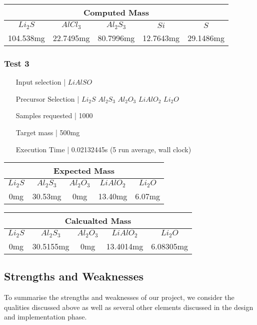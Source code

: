 \begin{table}[h!]
\centering
\begin{tabular}{@{}ccccc@{}}
\toprule
\multicolumn{5}{c}{Computed Mass} \\ \midrule
$Li_2S$ & $AlCl_3$ & $Al_2S_3$ & $Si$ & $S$ \\
104.538mg & 22.7495mg & 80.7996mg & 12.7643mg & 29.1486mg \\ \bottomrule
\end{tabular}
\end{table}

\subsubsection{Test 3}
\begin{enumerate}[label = {}, leftmargin=\widthof{Precursor Selection |}+\labelsep]
    \item[Input selection |] $LiAlSO$
    \item[Precursor Selection |] $Li_2S$ $Al_2S_3$ $Al_2O_3$ $LiAlO_2$ $Li_2O$
    \item[Samples requested |] 1000
    \item[Target mass |] 500mg
    \item[Execution Time |] 0.02132445s (5 run average, wall clock)
\end{enumerate}

\begin{table}[h!]
\centering
\begin{tabular}{@{}ccccc@{}}
\toprule
\multicolumn{5}{c}{Expected Mass} \\ \midrule
$Li_2S$ & $Al_2S_3$ & $Al_2O_3$ & $LiAlO_2$ & $Li_2O$ \\
0mg & 30.53mg & 0mg & 13.40mg & 6.07mg \\ \bottomrule
\end{tabular}
\end{table}

\begin{table}[h!]
\centering
\begin{tabular}{@{}ccccc@{}}
\toprule
\multicolumn{5}{c}{Calcualted Mass} \\ \midrule
$Li_2S$ & $Al_2S_3$ & $Al_2O_3$ & $LiAlO_2$ & $Li_2O$ \\
0mg & 30.5155mg & 0mg & 13.4014mg & 6.08305mg \\ \bottomrule
\end{tabular}
\end{table}

\subsection{Strengths and Weaknesses}
To summarise the strengths and weaknesses of our project, we consider the qualities discussed above as well as several other elements discussed in the design and implementation phase.


